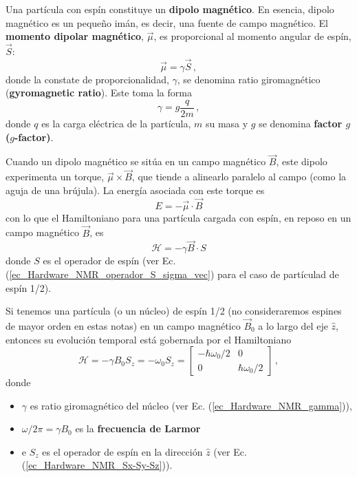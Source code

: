 
Una partícula con espín constituye un \textbf{dipolo magnético}. En esencia, dipolo magnético es un pequeño imán, es decir, una fuente de campo magnético. El \textbf{momento dipolar magnético}, $\vec{\mu}$, es proporcional al momento angular de espín, $\vec{S}$:
	\begin{equation} \label{ec_Hardware_NMR_mu}
	\vec{\mu} = \gamma \vec{S}\, ,
	\end{equation}
donde la constate de proporcionalidad, $\gamma$, se denomina ratio giromagnético (\textbf{gyromagnetic ratio}). Este toma la forma
	\begin{equation} \label{ec_Hardware_NMR_gamma}
	\gamma = g \frac{q}{2m} \, ,
	\end{equation}
donde $q$ es la carga eléctrica de la partícula, $m$ su masa y $g$ se denomina \textbf{factor $g$ ($g$-factor)}. 

Cuando un dipolo magnético se sitúa en un campo magnético $\vec{B}$, este dipolo experimenta un torque, $\vec{\mu} \times \vec{B}$, que tiende a alinearlo paralelo al campo (como la aguja de una brújula). La energía asociada con este torque es
	\begin{equation}
		E = - \vec{\mu} \cdot \vec{B}
		\end{equation}	
con lo que el Hamiltoniano para una partícula cargada con espín, en reposo en un campo magnético $\vec{B}$, es
	\begin{equation}
	\mathcal{H} = - \gamma \vec{B} \cdot S
	\end{equation}
donde $S$ es el operador de espín (ver Ec. (\ref{ec_Hardware_NMR_operador_S_sigma_vec}) para el caso de partículad de espín 1/2).

Si tenemos una partícula (o un núcleo) de espín 1/2 (no consideraremos espines de mayor orden en estas notas) en un campo magnético $\vec{B}_0$ a lo largo del eje $\hat{z}$, entonces su evolución temporal está gobernada por el Hamiltoniano
	\begin{equation} \label{ec_Hardware_NMR_H_sys_1}
	\boxed{\mathcal{H} = -  \gamma B_0 S_z = - \omega_0 S_z = 
	\begin{bmatrix}
	- \hbar \omega_0/2  & 0 \\
	0  &  \hbar \omega_0 /2
	\end{bmatrix}} \, ,
	\end{equation}
donde 
\begin{itemize}
	\item $\gamma$ es ratio giromagnético del núcleo (ver Ec. (\ref{ec_Hardware_NMR_gamma})),
	\item $\omega/2 \pi = \gamma B_0 $ es la \textbf{frecuencia de Larmor}
	\item e $S_z$ es el operador de espín en la dirección $\hat{z}$ (ver Ec. (\ref{ec_Hardware_NMR_Sx-Sy-Sz})).
\end{itemize}

